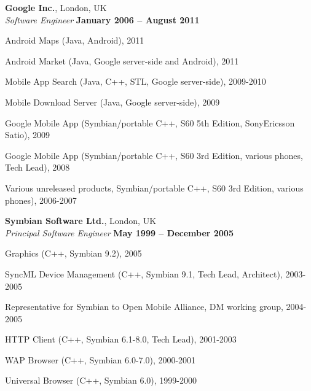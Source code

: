 \documentclass[line]{resume}
\begin{document}
\begin{resume}
    \textbf{Google Inc.}, London, UK \vspace{2mm}\\\vspace{1mm}%
    \textsl{Software Engineer} \hfill \textbf{January 2006 -- August 2011}\vspace{-3mm}\\\vspace{-1mm}%
    \begin{list2}
        \item Android Maps (Java,  Android), 2011
        \item Android Market (Java,  Google server-side and Android), 2011
        \item Mobile App Search (Java, C++, STL, Google server-side), 2009-2010
        \item Mobile Download Server (Java, Google server-side), 2009
        \item Google Mobile App (Symbian/portable C++, S60 5th Edition, SonyEricsson Satio), 2009
        \item Google Mobile App (Symbian/portable C++, S60 3rd Edition, various phones, Tech Lead), 2008
        \item Various unreleased products, Symbian/portable C++, S60 3rd Edition, various phones), 2006-2007
    \end{list2}\vspace{-1.5mm}

    \textbf{Symbian Software Ltd.}, London, UK \vspace{2mm}\\\vspace{1mm}%
    \textsl{Principal Software Engineer} \hfill \textbf{May 1999 -- December 2005}\vspace{-3mm}\\\vspace{-1mm}%
    \begin{list2}
        \item Graphics (C++, Symbian 9.2), 2005
        \item SyncML Device Management (C++, Symbian 9.1, Tech Lead, Architect), 2003-2005
        \item Representative for Symbian to Open Mobile Alliance, DM working group, 2004-2005
        \item HTTP Client (C++, Symbian 6.1-8.0, Tech Lead), 2001-2003
        \item WAP Browser (C++, Symbian 6.0-7.0), 2000-2001
        \item Universal Browser (C++, Symbian 6.0), 1999-2000
    \end{list2}\vspace{-1.5mm}
   

\end{resume}
\end{document}
